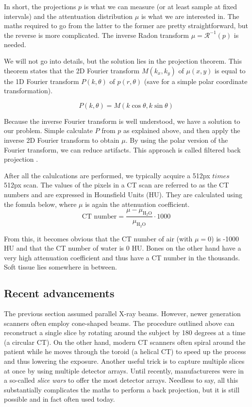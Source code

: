 In short, the projections $p$ is what we can measure (or at least sample at
fixed intervals) and the attentuation distribution $\mu$ is what we are
interested in. The maths required to go from the latter to the former are pretty
straightforward, but the reverse is more complicated. The inverse Radon
transform $\mu = \mathscr{R}^{-1}(p)$ is needed.

We will not go into details, but the solution lies in the projection theorem.
This theorem states that the 2D Fourier transform $M(k_x, k_y)$ of $\mu(x,y)$
is equal to the 1D Fourier transform $P(k, \theta)$ of $p(r, \theta)$ (save for
a simple polar coordinate transformation).

\begin{equation}
P(k, \theta) = M(k \cos \theta, k \sin \theta)
\end{equation}

Because the inverse Fourier transform is well understood, we have a solution to
our problem. Simple calculate $P$ from $p$ as explained above, and then apply
the inverse 2D Fourier transform to obtain $\mu$. By using the polar version of
the Fourier transform, we can reduce artifacts. This approach is called filtered
back projection \cite{suetens}.

After all the calulcations are performed, we typically acquire a 512px $times$
512px scan. The values of the pixels in a CT scan are referred to as the CT
numbers and are expressed in Hounsfield Units (HU). They are calculated using
the fomula below, where $\mu$ is again the attenuation coefficient.
\begin{equation}
	\text{CT number} = \frac{\mu -
	\mu_{\text{H}_2\text{O}}}{\mu_{\text{H}_2\text{O}}} \cdot 1000
\end{equation}

From this, it becomes obvious that the CT number of air (with $\mu = 0$) is
-1000 HU and that the CT number of water is 0 HU. Bones on the other hand have a
very high attenuation coefficient and thus have a CT number in the thousands.
Soft tissue lies somewhere in between.

\subsection{Recent advancements}
The previous section assumed parallel X-ray beams. However, newer generation
scanners often employ cone-shaped beams. The procedure outlined above can
reconstruct a single slice by rotating around the subject by 180 degrees at a
time (a circular CT). On the other hand, modern CT scanners often spiral around
the patient while he moves through the toroid (a helical CT) to speed up the
process and thus lowering the exposure. Another useful trick is to capture
multiple slices at once by using multiple detector arrays. Until recently,
manufactureres were in a so-called \emph{slice wars} to offer the most detector
arrays. Needless to say, all this substantially complicates the maths to perform
a back projection, but it is still possible and in fact often used today.

